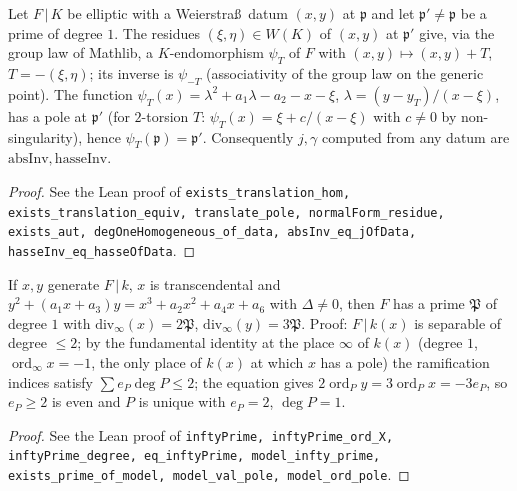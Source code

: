 \begin{lemma}
\label{lem:A1-homogeneity}
\leanok
Let $F\,|\,K$ be elliptic with a Weierstra\ss\ datum $(x,y)$ at $\mathfrak p$ and let $\mathfrak p'\ne\mathfrak p$ be a prime of degree $1$. The residues $(\xi,\eta)\in W(K)$ of $(x,y)$ at $\mathfrak p'$ give, via the group law of Mathlib, a $K$-endomorphism $\psi_T$ of $F$ with $(x,y)\mapsto(x,y)+T$, $T=-(\xi,\eta)$; its inverse is $\psi_{-T}$ (associativity of the group law on the generic point). The function $\psi_T(x)=\lambda^2+a_1\lambda-a_2-x-\xi$, $\lambda=(y-y_T)/(x-\xi)$, has a pole at $\mathfrak p'$ (for $2$-torsion $T$: $\psi_T(x)=\xi+c/(x-\xi)$ with $c\ne0$ by non-singularity), hence $\psi_T(\mathfrak p)=\mathfrak p'$. Consequently $j,\gamma$ computed from any datum are $\mathrm{absInv},\mathrm{hasseInv}$.
\end{lemma}
\begin{proof}
\leanok
See the Lean proof of \texttt{exists\_translation\_hom, exists\_translation\_equiv, translate\_pole, normalForm\_residue, exists\_aut, degOneHomogeneous\_of\_data, absInv\_eq\_jOfData, hasseInv\_eq\_hasseOfData}.
\end{proof}

\begin{lemma}
\label{lem:A1-model-prime}
\leanok
If $x,y$ generate $F\,|\,k$, $x$ is transcendental and $y^2+(a_1x+a_3)y=x^3+a_2x^2+a_4x+a_6$ with $\Delta\ne0$, then $F$ has a prime $\mathfrak P$ of degree $1$ with $\mathrm{div}_\infty(x)=2\mathfrak P$, $\mathrm{div}_\infty(y)=3\mathfrak P$. Proof: $F\,|\,k(x)$ is separable of degree $\le2$; by the fundamental identity at the place $\infty$ of $k(x)$ (degree $1$, $\operatorname{ord}_\infty x=-1$, the only place of $k(x)$ at which $x$ has a pole) the ramification indices satisfy $\sum e_P\deg P\le2$; the equation gives $2\operatorname{ord}_Py=3\operatorname{ord}_Px=-3e_P$, so $e_P\ge2$ is even and $P$ is unique with $e_P=2$, $\deg P=1$.
\end{lemma}
\begin{proof}
\leanok
See the Lean proof of \texttt{inftyPrime, inftyPrime\_ord\_X, inftyPrime\_degree, eq\_inftyPrime, model\_infty\_prime, exists\_prime\_of\_model, model\_val\_pole, model\_ord\_pole}.
\end{proof}

